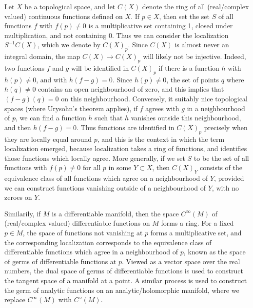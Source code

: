 \begin{example}
    Let $X$ be a topological space, and let $C(X)$ denote the ring of all (real/complex valued) continuous functions defined on $X$. If $p \in X$, then set the set $S$ of all functions $f$ with $f(p) \neq 0$ is a multiplicative set containing 1, closed under multiplication, and not containing 0. Thus we can consider the localization $S^{-1}C(X)$, which we denote by $C(X)_p$. Since $C(X)$ is almost never an integral domain, the map $C(X) \to C(X)_p$ will likely not be injective. Indeed, two functions $f$ and $g$ will be identified in $C(X)_p$ if there is a function $h$ with $h(p) \neq 0$, and with $h(f-g) = 0$. Since $h(p) \neq 0$, the set of points $q$ where $h(q) \neq 0$ contains an open neighbourhood of zero, and this implies that $(f - g)(q) = 0$ on this neighbourhood. Conversely, it suitably nice topological spaces (where Urysohn's theorem applies), if $f$ agrees with $g$ in a neighbourhood of $p$, we can find a function $h$ such that $h$ vanishes outside this neighbourhood, and then $h(f - g) = 0$. Thus functions are identified in $C(X)_p$ precisely when they are locally equal around $p$, and this is the context in which the term localization emerged, because localization takes a ring of functions, and identifies those functions which locally agree. More generally, if we set $S$ to be the set of all functions with $f(p) \neq 0$ for all $p$ in some $Y \subset X$, then $C(X)_Y$ consists of the equivalence class of all functions which agree on a neighbourhood of $Y$, provided we can construct functions vanishing outside of a neighbourhood of $Y$, with no zeroes on $Y$.
\end{example}

\begin{example}
    Similarily, if $M$ is a differentiable manifold, then the space $C^\infty(M)$ of (real/complex valued) differentiable functions on $M$ forms a ring. For a fixed $p \in M$, the space of functions not vanishing at $p$ forms a multiplicative set, and the corresponding localization corresponds to the equivalence class of differentiable functions which agree in a neighbourhood of $p$, known as the space of germs of differentiable functions at $p$. Viewed as a vector space over the real numbers, the dual space of germs of differentiable functions is used to construct the tangent space of a manifold at a point. A similar process is used to construct the germ of analytic functions on an analytic/holomorphic manifold, where we replace $C^\infty(M)$ with $C^\omega(M)$.
\end{example}

